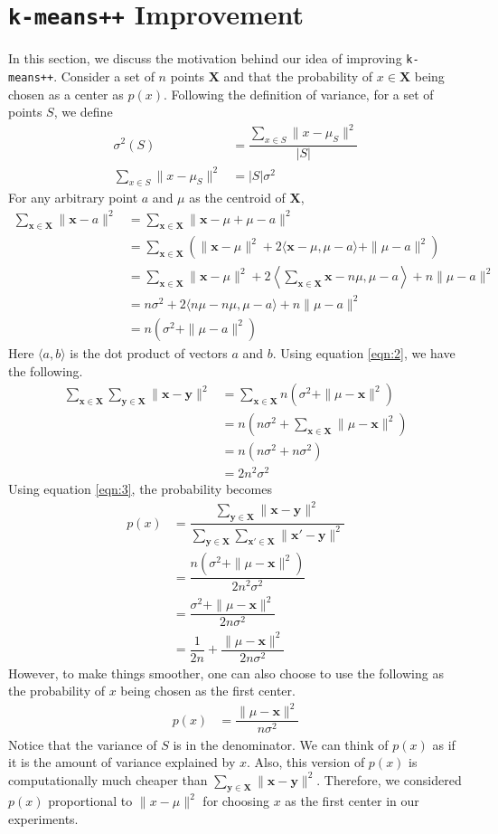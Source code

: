 \documentclass[12pt]{article}
\newcommand{\x}{\mathbf{x}}
\newcommand{\X}{\mathbf{X}}
\newcommand{\y}{\mathbf{y}}
\begin{document}
	\section{\texttt{k-means++} Improvement}\label{sec:motivation}
	In this section, we discuss the motivation behind our idea of improving \texttt{k-means++}.
	Consider a set of $n$ points $\X$ and that the probability of $x\in\X$ being chosen as a center as $p(x)$. Following the definition of variance, for a set of points $S$, we define
		\begin{align}
			\sigma^2(S) & = \dfrac{\sum_{x\in S} \|x-\mu_{S}\|^2}{|S|}\nonumber\\
			\sum_{x\in S}\|x-\mu_{S}\|^2 & = |S|\sigma^2\label{eqn:1}
		\end{align}
	For any arbitrary point $a$ and $\mu$ as the centroid of $\X$,
		\begin{align}
			\sum_{\x\in\X}\|\x-a\|^2
				  & = \sum_{\x\in\X}\|\x-\mu+\mu-a\|^2\nonumber\\
				  & = \sum_{\x\in\X}\left(\|\x-\mu\|^2+2\langle\x-\mu,\mu-a\rangle+\|\mu-a\|^2\right)\nonumber\\
				  & = \sum_{\x\in\X}\|\x-\mu\|^2+2\left\langle\sum_{\x\in\X}\x-n\mu,\mu-a\right\rangle+n\|\mu-a\|^2\nonumber\\
				  & = n\sigma^2+2\langle n\mu-n\mu,\mu-a\rangle+n\|\mu-a\|^2\nonumber\\
				  & = n(\sigma^2+\|\mu-a\|^2)\label{eqn:2}
		\end{align}
	Here $\langle a,b\rangle$ is the dot product of vectors $a$ and $b$. Using equation \eqref{eqn:2}, we have the following.
		\begin{align}
			\sum_{\x\in\X}\sum_{\y\in\X}\|\x-\y\|^2
				& = \sum_{\x\in\X}n(\sigma^2+\|\mu-\x\|^2)\nonumber\\
				& = n(n\sigma^2+\sum_{\x\in\X}\|\mu-\x\|^2)\nonumber\\
				& = n(n\sigma^2+n\sigma^2)\nonumber\\
				& = 2n^2\sigma^2\label{eqn:3}
		\end{align}
	Using equation \eqref{eqn:3}, the probability becomes
		\begin{align*}
			p(x) & = \dfrac{\sum_{\y\in\X}\|\x-\y\|^2}{\sum_{\y\in\X}\sum_{\x'\in\X}\|\x'-\y\|^2}\\
				 & = \dfrac{n(\sigma^2+\|\mu-\x\|^2)}{2n^2\sigma^2}\\
				 & = \dfrac{\sigma^2+\|\mu-\x\|^2}{2n\sigma^2}\\
				 & = \dfrac{1}{2n}+\dfrac{\|\mu-\x\|^2}{2n\sigma^2}
		\end{align*}
	However, to make things smoother, one can also choose to use the following as the probability of $x$ being chosen as the first center.
		\begin{align*}
			p(x) & = \dfrac{\|\mu-\x\|^2}{n\sigma^2}
		\end{align*}
	Notice that the variance of $S$ is in the denominator. We can think of $p(x)$ as if it is the amount of variance explained by $x$. Also, this version of $p(x)$ is computationally much cheaper than $\sum_{\y\in\X}\|\x-\y\|^2$. Therefore, we considered $p(x)$ proportional to $\|x-\mu\|^2$ for choosing $x$ as the first center in our experiments.
\end{document}
